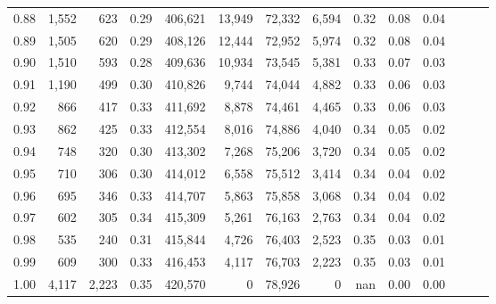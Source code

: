 \begin{tabular}{rrrrrrrrrrrrrr}
0.88 &   1,552 &    623 &  0.29 &  406,621 &   13,949 &  72,332 &   6,594 &  0.32 &  0.08 &      0.04 \\
0.89 &   1,505 &    620 &  0.29 &  408,126 &   12,444 &  72,952 &   5,974 &  0.32 &  0.08 &      0.04 \\
0.90 &   1,510 &    593 &  0.28 &  409,636 &   10,934 &  73,545 &   5,381 &  0.33 &  0.07 &      0.03 \\
0.91 &   1,190 &    499 &  0.30 &  410,826 &    9,744 &  74,044 &   4,882 &  0.33 &  0.06 &      0.03 \\
0.92 &     866 &    417 &  0.33 &  411,692 &    8,878 &  74,461 &   4,465 &  0.33 &  0.06 &      0.03 \\
0.93 &     862 &    425 &  0.33 &  412,554 &    8,016 &  74,886 &   4,040 &  0.34 &  0.05 &      0.02 \\
0.94 &     748 &    320 &  0.30 &  413,302 &    7,268 &  75,206 &   3,720 &  0.34 &  0.05 &      0.02 \\
0.95 &     710 &    306 &  0.30 &  414,012 &    6,558 &  75,512 &   3,414 &  0.34 &  0.04 &      0.02 \\
0.96 &     695 &    346 &  0.33 &  414,707 &    5,863 &  75,858 &   3,068 &  0.34 &  0.04 &      0.02 \\
0.97 &     602 &    305 &  0.34 &  415,309 &    5,261 &  76,163 &   2,763 &  0.34 &  0.04 &      0.02 \\
0.98 &     535 &    240 &  0.31 &  415,844 &    4,726 &  76,403 &   2,523 &  0.35 &  0.03 &      0.01 \\
0.99 &     609 &    300 &  0.33 &  416,453 &    4,117 &  76,703 &   2,223 &  0.35 &  0.03 &      0.01 \\
1.00 &   4,117 &  2,223 &  0.35 &  420,570 &        0 &  78,926 &       0 &   nan &  0.00 &      0.00 \\
\bottomrule
\end{tabular}
